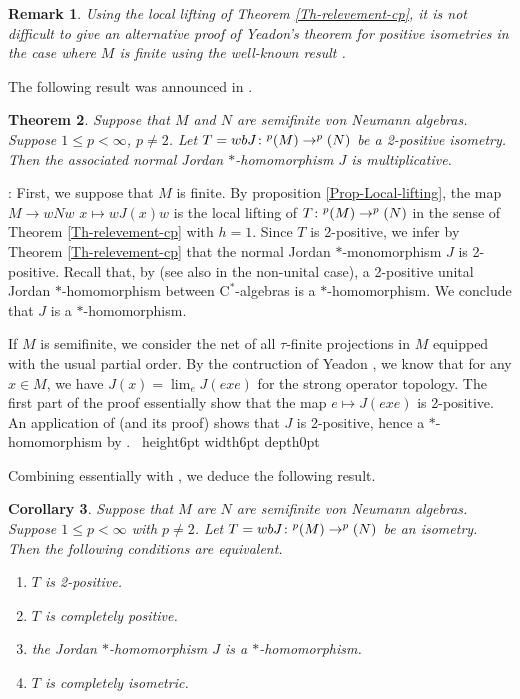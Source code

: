 \documentclass[leqno]{article} %
\let\L\relax
\newcommand{\L}{\mathrm{L}}
\renewcommand{\leq}{\ensuremath{\leqslant}}
\newcommand{\qed}{\hfill \vrule height6pt  width6pt depth0pt}
\newcommand{\co}{\colon}
\newtheorem{thm}{Theorem}[section]
\newtheorem{cor}[thm]{Corollary}
\newtheorem{remark}[thm]{Remark}
\newenvironment{proof}[1][]{\noindent {\it Proof #1} : }{\hbox{~}\qed
\smallskip
}
\numberwithin{equation}{section}
\begin{document}
\begin{remark} \normalfont
Using the local lifting of Theorem \ref{Th-relevement-cp}, it is not difficult to give an alternative proof of Yeadon's theorem for \textit{positive} isometries in the case where $M$ is finite using the well-known result \cite[Lemma 3.3]{Wol1}.
\end{remark}

The following result was announced in \cite[Theorem 2.10]{HRW1}. 

\begin{thm}
\label{thm-iso-cp}
Suppose that $M$ and $N$ are semifinite von Neumann algebras. Suppose $1\leq p < \infty$, $p \not=2$. Let $T=wbJ \co \L^p(M) \to \L^p(N)$ be a 2-positive isometry. Then the associated normal Jordan $*$-homomorphism $J$ is multiplicative.
\end{thm}

\begin{proof} 
First, we suppose that $M$ is finite. By proposition \ref{Prop-Local-lifting}, the map $M \to wNw$ $x \mapsto wJ(x)w$ is the local lifting of $T \co \L^p(M) \to \L^p(N)$ in the sense of Theorem \ref{Th-relevement-cp} with $h=1$. Since $T$ is 2-positive, we infer by Theorem \ref{Th-relevement-cp} that the normal Jordan $*$-monomorphism $J$ is 2-positive. Recall that, by \cite[Corollary 3.2]{Cho1} (see also \cite[Corollary 6]{Gar1} in the non-unital case), a 2-positive unital Jordan $*$-homomorphism between $\mathrm{C}^*$-algebras is a $*$-homomorphism. We conclude that $J$ is a $*$-homomorphism.

If $M$ is semifinite, we consider the net of all $\tau$-finite projections in $M$ equipped with the usual partial order. By the contruction of Yeadon \cite{Yea1}, we know that for any $x \in M$, we have $J(x)=\lim_e J(exe)$ for the strong operator topology. The first part of the proof essentially show that the map $e \mapsto J(exe)$ is 2-positive. An application of \cite[Lemma 2.8]{ArK} (and its proof) shows that $J$ is 2-positive, hence a $*$-homomorphism by \cite[Corollary 3.2]{Cho1}.
\end{proof}



Combining essentially with \cite[Proposition 3.2]{JRS1}, we deduce the following result.

\begin{cor}
\label{Cor-cp}
Suppose that $M$ are $N$ are semifinite von Neumann algebras. Suppose $1 \leq p < \infty$ with $p \not=2$. Let $T=wbJ \co \L^p(M) \to \L^p(N)$ be an isometry. Then the following conditions are equivalent.
\begin{enumerate}
	\item $T$ is 2-positive. 
	\item $T$ is completely positive.
	\item the Jordan $*$-homomorphism $J$ is a $*$-homomorphism.
	\item $T$ is completely isometric.
\end{enumerate}
\end{cor}
\end{document}
